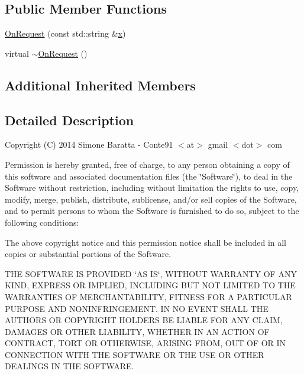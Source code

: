 \subsection*{Public Member Functions}
\begin{DoxyCompactItemize}
\item 
\hyperlink{class_on_request_ab8874c9a65ebce9d4f5fd971642bee3f}{On\+Request} (const std\+::string \&\hyperlink{jquery_8js_a4c3eadaa5164016d2c340d495fc6e55e}{x})
\item 
virtual \hyperlink{class_on_request_ab6d0d536194819118450775ea43723f4}{$\sim$\+On\+Request} ()
\end{DoxyCompactItemize}
\subsection*{Additional Inherited Members}


\subsection{Detailed Description}
Copyright (C) 2014 Simone Baratta -\/ Conte91 $<$at$>$ gmail $<$dot$>$ com

Permission is hereby granted, free of charge, to any person obtaining a copy of this software and associated documentation files (the \char`\"{}\+Software\char`\"{}), to deal in the Software without restriction, including without limitation the rights to use, copy, modify, merge, publish, distribute, sublicense, and/or sell copies of the Software, and to permit persons to whom the Software is furnished to do so, subject to the following conditions\+:

The above copyright notice and this permission notice shall be included in all copies or substantial portions of the Software.

T\+H\+E S\+O\+F\+T\+W\+A\+R\+E I\+S P\+R\+O\+V\+I\+D\+E\+D \char`\"{}\+A\+S I\+S\char`\"{}, W\+I\+T\+H\+O\+U\+T W\+A\+R\+R\+A\+N\+T\+Y O\+F A\+N\+Y K\+I\+N\+D, E\+X\+P\+R\+E\+S\+S O\+R I\+M\+P\+L\+I\+E\+D, I\+N\+C\+L\+U\+D\+I\+N\+G B\+U\+T N\+O\+T L\+I\+M\+I\+T\+E\+D T\+O T\+H\+E W\+A\+R\+R\+A\+N\+T\+I\+E\+S O\+F M\+E\+R\+C\+H\+A\+N\+T\+A\+B\+I\+L\+I\+T\+Y, F\+I\+T\+N\+E\+S\+S F\+O\+R A P\+A\+R\+T\+I\+C\+U\+L\+A\+R P\+U\+R\+P\+O\+S\+E A\+N\+D N\+O\+N\+I\+N\+F\+R\+I\+N\+G\+E\+M\+E\+N\+T. I\+N N\+O E\+V\+E\+N\+T S\+H\+A\+L\+L T\+H\+E A\+U\+T\+H\+O\+R\+S O\+R C\+O\+P\+Y\+R\+I\+G\+H\+T H\+O\+L\+D\+E\+R\+S B\+E L\+I\+A\+B\+L\+E F\+O\+R A\+N\+Y C\+L\+A\+I\+M, D\+A\+M\+A\+G\+E\+S O\+R O\+T\+H\+E\+R L\+I\+A\+B\+I\+L\+I\+T\+Y, W\+H\+E\+T\+H\+E\+R I\+N A\+N A\+C\+T\+I\+O\+N O\+F C\+O\+N\+T\+R\+A\+C\+T, T\+O\+R\+T O\+R O\+T\+H\+E\+R\+W\+I\+S\+E, A\+R\+I\+S\+I\+N\+G F\+R\+O\+M, O\+U\+T O\+F O\+R I\+N C\+O\+N\+N\+E\+C\+T\+I\+O\+N W\+I\+T\+H T\+H\+E S\+O\+F\+T\+W\+A\+R\+E O\+R T\+H\+E U\+S\+E O\+R O\+T\+H\+E\+R D\+E\+A\+L\+I\+N\+G\+S I\+N T\+H\+E S\+O\+F\+T\+W\+A\+R\+E. 

